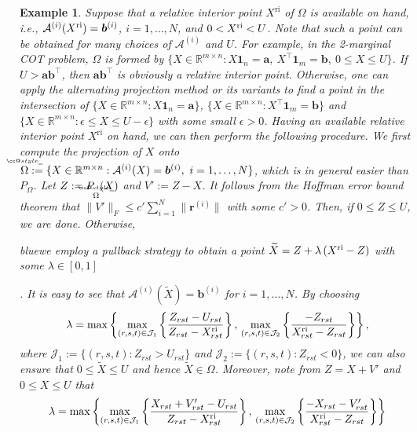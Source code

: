 \documentclass[10pt]{article}
\makeatletter
\def \widebar{\accentset{{\cc@style\underline{\mskip10mu}}}}
\newcommand{\blue}[1]{\begin{color}{blue}#1\end{color}}
\newtheorem{example}{Example}
\makeatother
\begin{document}
\begin{example}
Suppose that a relative interior point $X^{\mathrm{ri}}$ of $\Omega$ is available on hand, i.e., $\mathcal{A}^{(i)}(X^{\rm ri})=\bm{b}^{(i)}$, $i=1,\dots,N$, and $0<X^{\rm ri}<U$. Note that such a point can be obtained for many choices of $\mathcal{A}^{(i)}$ and $U$. For example, in the 2-marginal COT problem, $\Omega$ is formed by $\{X\in\mathbb{R}^{m \times n}: X\bm{1}_n=\bm{a}, ~X^{\top}\bm{1}_m=\bm{b}, ~0\leq X\leq U\}$. If $U>\bm{a}\bm{b}^{\top}$, then $\bm{a}\bm{b}^{\top}$ is obviously a relative interior point. Otherwise, one can apply the alternating projection method or its variants to find a point in the intersection of $\{X\in\mathbb{R}^{m \times n}: X\bm{1}_n=\bm{a}\}$, $\{X\in\mathbb{R}^{m \times n}: X^{\top}\bm{1}_m=\bm{b}\}$ and $\{X\in\mathbb{R}^{m \times n}: \epsilon\leq X\leq U-\epsilon\}$ with some small $\epsilon>0$. Having an available relative interior point $X^{\mathrm{ri}}$ on hand, we can then perform the following procedure. We first compute the projection of $X$ onto $\widebar{\Omega}:=\{X\in\mathbb{R}^{m \times n} :\mathcal{A}^{(i)}(X)=\bm{b}^{(i)}, ~i=1,\dots,N\}$, which is in general easier than $P_{\Omega}$. Let $Z:=P_{\widebar{\Omega}}(X)$ and $V':=Z-X$. It follows from the Hoffman error bound theorem that $\|V'\|_F\leq c'\sum^N_{i=1}\|\bm{r}^{(i)}\|$ with some $c'>0$. Then, if $0 \leq Z \leq U$, we are done. Otherwise, \blue{we employ a pullback strategy to obtain a point $\widetilde{X}=Z+\lambda\,(X^{\rm ri}-Z)$ with some $\lambda \in[0,1]$}. It is easy to see that $\mathcal{A}^{(i)}(\widetilde{X})=\bm{b}^{(i)}$ for $i=1,\dots,N$. By choosing
\begin{equation*}
\lambda = \max\left\{ \max\limits_{(r,s,t)\in\mathcal{J}_1}\left\{\frac{Z_{rst}-U_{rst}}{Z_{rst}-X^{\rm ri}_{rst}}\right\},\,\max\limits_{(r,s,t)\in\mathcal{J}_2}\left\{\frac{-Z_{rst}}{X^{\rm ri}_{rst}-Z_{rst}}\right\}\right\},
\end{equation*}
where $\mathcal{J}_1:=\{(r,s,t):Z_{rst}>U_{rst}\}$ and $\mathcal{J}_2:=\{(r,s,t):Z_{rst}<0\}$, we can also ensure that $0\leq \widetilde{X}\leq U$ and hence $\widetilde{X}\in\Omega$. Moreover, note from $Z=X+V'$ and $0\leq X\leq U$ that
\begin{equation*}
\begin{aligned}
\lambda &= \max\left\{ \max\limits_{(r,s,t)\in\mathcal{J}_1}\left\{\frac{X_{rst}+V'_{rst}-U_{rst}}{Z_{rst}-X^{\rm ri}_{rst}}\right\},\,\max\limits_{(r,s,t)\in\mathcal{J}_2}\left\{\frac{-X_{rst}-V'_{rst}}{X^{\rm ri}_{rst}-Z_{rst}}\right\}\right\}  \\

\end{aligned}
\end{equation*}
\end{example}
\end{document}
